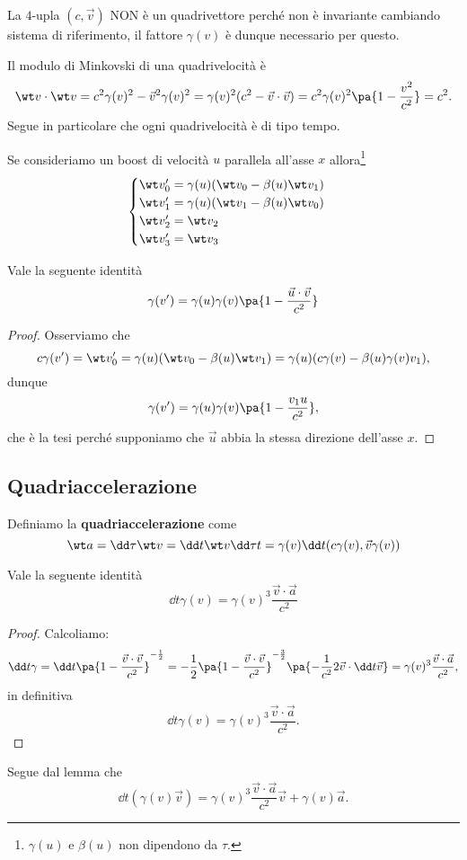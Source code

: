\begin{remark}
La $4$-upla $(c,\vec v)$ NON \`e un quadrivettore perch\'e non \`e invariante cambiando sistema di riferimento, il fattore $\gamma(v)$ \`e dunque necessario per questo.
\end{remark}

\begin{remark}
Il modulo di Minkovski di una quadrivelocit\`a \`e
\[\wt v\cdot \wt v=c^2\gamma(v)^2-\vec v^2\gamma(v)^2=\gamma(v)^2(c^2-\vec v\cdot \vec v)=c^2\gamma(v)^2\pa{1-\frac{v^2}{c^2}}=c^2.\]
Segue in particolare che ogni quadrivelocit\`a \`e di tipo tempo.
\end{remark}

\noindent Se consideriamo un boost di velocit\`a $u$ parallela all'asse $x$ allora\footnote{$\gamma(u)$ e $\beta(u)$ non dipendono da $\tau$.}
\[\begin{cases}
\wt v_0'=\gamma(u)(\wt v_0-\beta(u)\wt v_1)\\
\wt v_1'=\gamma(u)(\wt v_1-\beta(u)\wt v_0)\\
\wt v_2'=\wt v_2\\
\wt v_3'=\wt v_3
\end{cases}\]

\begin{proposition}
Vale la seguente identit\`a
\[\gamma(v')=\gamma(u)\gamma(v)\pa{1-\frac{\vec u\cdot \vec v}{c^2}}\]
\end{proposition}
\begin{proof}
Osserviamo che
\[c\gamma(v')=\wt v_0'=\gamma(u)(\wt v_0-\beta(u)\wt v_1)=\gamma(u)(c\gamma(v)-\beta(u)\gamma(v)v_1),\]
dunque
\[\gamma(v')=\gamma(u)\gamma(v)\pa{1-\frac{v_1 u}{c^2}},\]
che \`e la tesi perch\'e supponiamo che $\vec u$ abbia la stessa direzione dell'asse $x$.
\end{proof}

\subsection{Quadriaccelerazione}
\begin{definition}[Quadriaccelerazione]
Definiamo la \textbf{quadriaccelerazione} come
\[\wt a=\dd\tau{\wt v}=\dd t{\wt v}\dd\tau t=\gamma(v)\dd t{}(c\gamma(v),\vec v\gamma(v))\]
\end{definition}
\begin{lemma}
Vale la seguente identit\`a
\[\boxed{\dd t{\gamma(v)}=\gamma(v)^3\frac{\vec v\cdot \vec a}{c^2}}\]
\end{lemma}
\begin{proof}
Calcoliamo:
\[\dd t\gamma=\dd t{}\pa{1-\frac{\vec v\cdot \vec v}{c^2}}^{-\frac12}=-\frac12\pa{1-\frac{\vec v\cdot \vec v}{c^2}}^{-\frac32}\pa{-\frac1{c^2}2\vec v\cdot \dd t{\vec v}}=\gamma(v)^3\frac{\vec v\cdot \vec a}{c^2},\]
in definitiva
\[{\dd t{\gamma(v)}=\gamma(v)^3\frac{\vec v\cdot \vec a}{c^2}}.\]
\end{proof}
\begin{corollary}
Segue dal lemma che
\[\dd t{}(\gamma(v)\vec v)=\gamma(v)^3\frac{\vec v\cdot \vec a}{c^2}\vec v+\gamma(v)\vec a.\]
\end{corollary}

